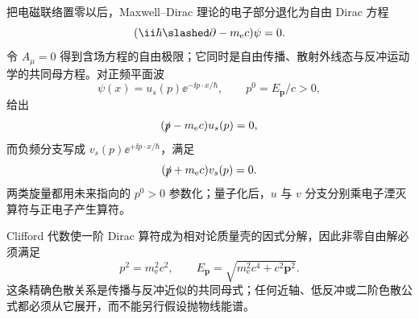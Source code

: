 把电磁联络置零以后，Maxwell--Dirac 理论的电子部分退化为自由 Dirac 方程
\begin{equation}
 (\ii\hbar\slashed\partial-m_{\mathrm e} c)\psi=0.
 \label{eq:free-dirac}\end{equation}
令 $A_\mu=0$ 得到含场方程的自由极限；它同时是自由传播、散射外线态与反冲运动学的共同母方程。对正频平面波
\begin{equation*}
 \psi(x)=u_s(p)\ee^{-\ii p\cdot x/\hbar},
 \qquad p^0=E_{\mathbf p}/c>0,
\end{equation*}
 给出
\begin{equation}
 (\slashed p-m_{\mathrm e} c)u_s(p)=0,
 \label{eq:u-dirac}
\end{equation}
而负频分支写成 $v_s(p)\ee^{+\ii p\cdot x/\hbar}$，满足
\begin{equation}
 (\slashed p+m_{\mathrm e} c)v_s(p)=0.
 \label{eq:v-dirac}
\end{equation}
两类旋量都用未来指向的 $p^0>0$ 参数化；量子化后，$u$ 与 $v$ 分支分别乘电子湮灭算符与正电子产生算符。

Clifford 代数使一阶 Dirac 算符成为相对论质量壳的因式分解，因此非零自由解必须满足
\begin{equation}
 \boxed{
 p^2=m_{\mathrm e}^2c^2,
 \qquad
 E_{\mathbf p}=\sqrt{m_{\mathrm e}^2c^4+c^2\mathbf p^2}.}
 \label{eq:rel-dispersion}\end{equation}
这条精确色散关系是传播与反冲近似的共同母式；任何近轴、低反冲或二阶色散公式都必须从它展开，而不能另行假设抛物线能谱。

